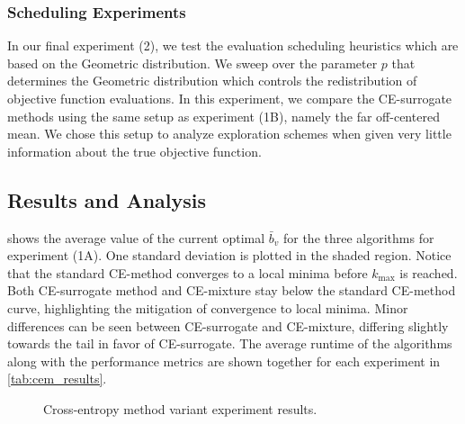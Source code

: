 \vspace{-8mm} %
\subsubsection{Scheduling Experiments} \label{sec:cem_schedule_experiments}
In our final experiment (2), we test the evaluation scheduling heuristics which are based on the Geometric distribution.
We sweep over the parameter $p$ that determines the Geometric distribution which controls the redistribution of objective function evaluations.
In this experiment, we compare the CE-surrogate methods using the same setup as experiment (1B), namely the far off-centered mean.
We chose this setup to analyze exploration schemes when given very little information about the true objective function.



\subsection{Results and Analysis} \label{sec:cem_results}

 shows the average value of the current optimal $\bar{b}_v$ for the three algorithms for experiment (1A). 
One standard deviation is plotted in the shaded region.
Notice that the standard CE-method converges to a local minima before $k_\text{max}$ is reached.
Both CE-surrogate method and CE-mixture stay below the standard CE-method curve, highlighting the mitigation of convergence to local minima.
Minor differences can be seen between CE-surrogate and CE-mixture, differing slightly towards the tail in favor of CE-surrogate.
The average runtime of the algorithms along with the performance metrics are shown together for each experiment in \cref{tab:cem_results}.

\begin{figure*}[ht]
    \centering
    \hspace{2mm}
    \hspace{2mm}
    \caption{Cross-entropy method variant experiment results.}\label{fig:cem_experiments}
\end{figure*}


